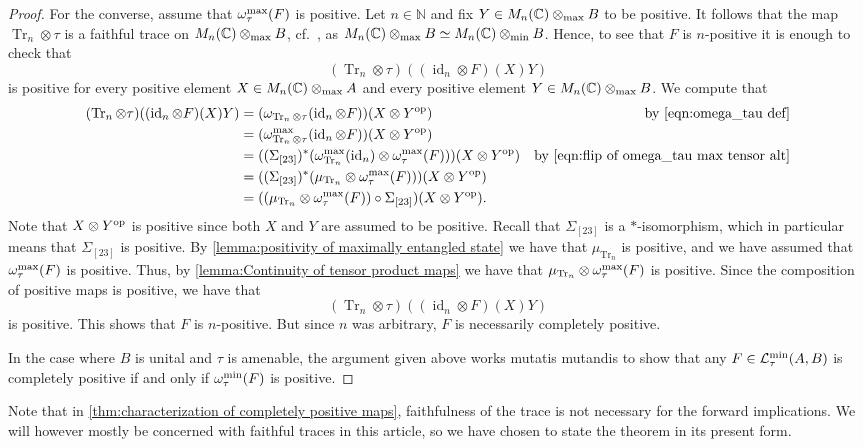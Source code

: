 \documentclass[11pt, a4paper, oneside, final, reqno]{amsart}
\newcommand{\calL}{\mathcal{L}}
\newcommand{\bbN}{\mathbb{N}}
\newcommand{\bbC}{\mathbb{C}}
\newcommand{\id}{\operatorname{id}}
\newcommand{\Tr}{\operatorname{Tr}}
\theoremstyle{definition}
\theoremstyle{plain}
\theoremstyle{remark}
\numberwithin{equation}{section}
\begin{document}
\begin{proof}
    For the converse, assume that $\omega_\tau^{\rm max}(F)$ is positive. Let $n \in \bbN$ and fix $Y \in M_n(\bbC) \otimes_{\rm max} B$ to be positive. It follows that the
    map $\Tr_n \otimes \tau$ is a faithful trace on $M_n(\bbC) \otimes_{\rm max} B$, cf.~\cite[p. 434]{Avitzour1982}, as $M_n(\bbC) \otimes_{\rm max} B \simeq M_n(\bbC) \otimes_{\rm min} B$. Hence, to see that $F$ is $n$-positive it is enough to check that
    \begin{equation*}
        (\Tr_n \otimes \tau)((\id_n \otimes F)(X)Y)
    \end{equation*}
    is positive for every positive element $X \in M_n(\bbC) \otimes_{\rm max} A$ and every positive element $Y \in M_n(\bbC) \otimes_{\rm  max} B$. We compute that
    \begin{align*}
        (\Tr_n \otimes \tau)((\id_n \otimes F)(X)Y)
        & = (\omega_{\Tr_n \otimes \tau}(\id_n \otimes F))(X \otimes Y^{\rm op}) & \text{by \eqref{eqn:omega_tau def}} \\
        & = (\omega_{\Tr_n \otimes \tau}^{\rm max}(\id_n \otimes F))(X \otimes Y^{\rm op}) & \\
        & = ((\Sigma_{[23]})^*(\omega_{\Tr_n}^{\rm max}(\id_n) \otimes \omega_\tau^{\rm max}(F))) (X \otimes Y^{\rm op}) & \text{by \eqref{eqn:flip of omega_tau max tensor alt}} \\
        & = ((\Sigma_{[23]})^*(\mu_{\Tr_n} \otimes \omega_\tau^{\rm max}(F))) (X \otimes Y^{\rm op}) & \\
        & = ((\mu_{\Tr_n} \otimes \omega_\tau^{\rm max}(F)) \circ \Sigma_{[23]}) (X \otimes Y^{\rm op}). &
    \end{align*}
    Note that $X \otimes Y^{\rm op}$ is positive since both $X$ and $Y$ are assumed to be positive. Recall that $\Sigma_{[23]}$ is a $*$-isomorphism, which in particular means that $\Sigma_{[23]}$ is positive. By \cref{lemma:positivity of maximally entangled state} we have that $\mu_{\Tr_n}$ is positive, and we have assumed that $\omega_\tau^{\rm max}(F)$ is positive. Thus, by \cref{lemma:Continuity of tensor product maps} we have that $\mu_{\Tr_n} \otimes \omega_\tau^{\rm max}(F)$ is positive. Since the composition of positive maps is positive, we have that
    \begin{equation*}
        (\Tr_n \otimes \tau)((\id_n \otimes F)(X)Y)
    \end{equation*}
    is positive. This shows that $F$ is $n$-positive. But since $n$ was arbitrary, $F$ is necessarily completely positive.

    In the case where $B$ is unital and $\tau$ is amenable, the argument given above works mutatis mutandis to show that any $F \in \calL_\tau^{\rm min}(A,B)$ is completely positive if and only if $\omega_\tau^{\rm min}(F)$ is positive.
\end{proof}
Note that in \cref{thm:characterization of completely positive maps}, faithfulness of the trace is not necessary for the forward implications. We will however mostly be concerned with faithful traces in this article, so we have chosen to state the theorem in its present form.
\end{document}
